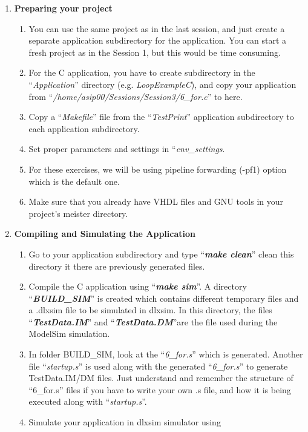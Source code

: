 \begin{enumerate}
\item \textbf{Preparing your project}
	
	\begin{enumerate}
	\item You can use the same project as in the last session, and just create a separate application subdirectory for the application. You can
		start a fresh project as in the Session 1, but this would be time
		consuming.
	\item For the C application, you have to create subdirectory in the
		``\emph{Application}'' directory (e.g. \emph{LoopExampleC}), and
		copy your application from
		``\emph{/home/asip00/Sessions/Session3/6\_for.c}'' to here.
	\item Copy a ``\emph{Makefile}'' file from the ``\emph{TestPrint}''
		application subdirectory to each application subdirectory.
	\item Set proper parameters and settings in ``\emph{env\_settings}.
	\item For these exercises, we will be using pipeline forwarding (-pf1)
		option which is the default one.
	\item Make sure that you already have VHDL files and GNU tools in your
		project's meister directory.
	\end{enumerate}
\item \textbf{Compiling and Simulating the Application}
	\begin{enumerate}
	\item Go to your application subdirectory and type ``\emph{\textbf{make clean}}'' clean this directory it there are previously generated files.
	\item Compile the C application using ``\emph{\textbf{make sim}}''. A directory ``\emph{\textbf{BUILD\_SIM}}'' is created which contains different temporary files and a .dlxsim file to be simulated in dlxsim. In this directory, the files ``\emph{\textbf{TestData.IM}}'' and ``\emph{\textbf{TestData.DM}}''are the file used during the ModelSim simulation.
	\item In folder BUILD\_SIM, look at the ``\emph{6\_for.s}'' which is
	generated. Another file ``\emph{startup.s}'' is used along with the
	generated ``\emph{6\_for.s}'' to generate TestData.IM/DM files. Just
	understand and remember the structure of ``6\_for.s'' files if you
	have to write your own .s file, and how it is being executed along
	with ``\emph{startup.s}''.
	\item
	Simulate your application in dlxsim simulator using

\end{enumerate}
\end{enumerate}
